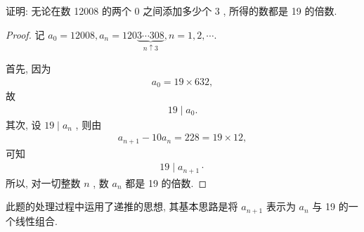 \begin{example}
	证明: 无论在数 12008 的两个 0 之间添加多少个 3 , 所得的数都是 19 的倍数.
\end{example}
\begin{proof}
	记 $a_{0}=12008, a_{n}=120 \underbrace{3 \cdots 308}_{n \uparrow 3}, n=1,2, \cdots$.

	首先, 因为
\begin{align*}
		a_{0}=19 \times 632,
	\end{align*}
	故
\begin{align*}
		19 \mid a_{0}.
	\end{align*}
	其次, 设 $19 \mid a_{n}$ , 则由
\begin{align*}
		a_{n+1}-10 a_{n}=228=19 \times 12,
	\end{align*}
	可知
\begin{align*}
		19 \mid a_{n+1} \cdot
	\end{align*}
	所以, 对一切整数 $n$ , 数 $a_{n}$ 都是 19 的倍数.
\end{proof}
\begin{note}
	此题的处理过程中运用了递推的思想, 其基本思路是将 $a_{n+1}$ 表示为 $a_{n}$ 与 19 的一个线性组合.
\end{note}

